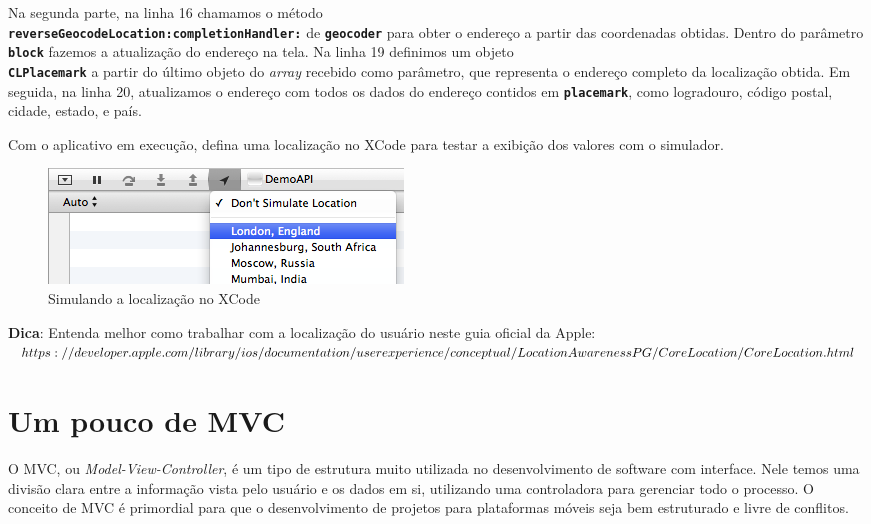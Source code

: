 \documentclass[a4paper,12pt,brazil,doubleside]{book}
\begin{document}
\begin{singlespace}
Na segunda parte, na linha 16 chamamos o método\\ \texttt{\textbf{reverseGeocodeLocation:completionHandler:}} de \texttt{\textbf{geocoder}} para obter o endereço a partir das coordenadas obtidas. Dentro do parâmetro \texttt{\textbf{block}} fazemos a atualização do endereço na tela. Na linha 19 definimos um objeto\\ \texttt{\textbf{CLPlacemark}} a partir do último objeto do \emph{array} recebido como parâmetro, que representa o endereço completo da localização obtida. Em seguida, na linha 20, atualizamos o endereço com todos os dados do endereço contidos em \texttt{\textbf{placemark}}, como logradouro, código postal, cidade, estado, e país.

Com o aplicativo em execução, defina uma localização no XCode para testar a exibição dos valores com o simulador.

\begin{figure}[H]
  \centering
  \includegraphics[width=.75\textwidth]{figuras/location.png}
  \caption{Simulando a localização no XCode}
  \label{fig:a}
\end{figure}

\begin{framed}

\textbf{Dica}: Entenda melhor como trabalhar com a localização do usuário neste guia oficial da Apple:\\
\(https://developer.apple.com/library/ios/documentation/userexperience/conceptual/\\LocationAwarenessPG/CoreLocation/CoreLocation.html\)
\end{framed}

\chapter{Um pouco de MVC}

O MVC, ou \emph{Model-View-Controller}, é um tipo de estrutura muito utilizada no desenvolvimento de software com interface. Nele temos uma divisão clara entre a informação vista pelo usuário e os dados em si, utilizando uma controladora para gerenciar todo o processo. O conceito de MVC é primordial para que o desenvolvimento de projetos para plataformas móveis seja bem estruturado e livre de conflitos.


\end{singlespace}
\end{document}
